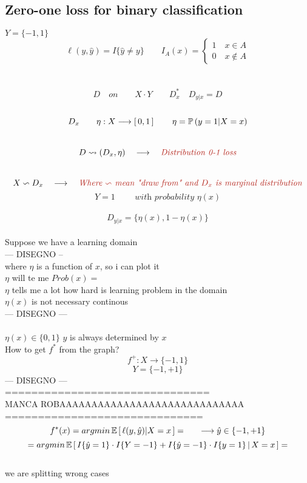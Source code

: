 \documentclass[../main.tex]{subfiles}
\begin{document}
\subsection{Zero-one loss for binary classification}
$ Y = \{-1,1\}
$
$$
\ell(y,\hat{y}) = I \{ \hat{y} \neq y \} 
\qquad I_A (x) = 
\begin{cases}
1 \quad  x \in A
\\
0 \quad  x \not\in A
\end{cases}
$$
\\
\\
$$
D \quad on \qquad X \cdot Y \qquad D_x^* \quad D_{y|x} = D
$$\
$$
D_x \qquad \eta: X \longrightarrow \left[ \, 0,1 \, \right] \qquad \eta = \mathbb{P} \,(y = 1 | X = x )
$$\
$$
D \leadsto (D_x, \eta) \quad \longrightarrow \quad \red{\textit{Distribution 0-1 loss}}
$$\
$$
X \backsim D_x \quad \longrightarrow \quad \red{ \textit{Where $\backsim$ mean "draw from" and $D_x$ is marginal distribution} }  
$$
$$
Y = 1 \qquad \textit{   with probability } \eta(x)
$$\
$$
D_{y|x} = \{ \eta(x), 1- \eta(x) \}
$$
\\
Suppose we have a learning domain\\
--- DISEGNO --
\\
where $\eta$ is a function of $x$, so i can plot it\\
$\eta$ will te me $Prob (x) = $
\\
$\eta$ tells me a lot how hard is learning problem in the domain
\\
$\eta(x)$ is not necessary continous
\\
--- DISEGNO ---
\\\\
$\eta(x) \in \{0,1\} $ \qquad $y$ is always determined by $x$
\\
How to get $f^*$ from the graph?
\\
$$
f^+ : X \rightarrow \{-1,1\}
$$
$$
Y = \{-1, +1 \}
$$
--- DISEGNO ---\\
===============================\\
MANCA ROBAAAAAAAAAAAAAAAAAAAAAAAAAAAAA\\
==============================
$$
f^*(x) = argmin \, \mathbb{E} \left[ \,  \ell(y, \hat{y}) | X= x\, \right] =  \qquad \longrightarrow \hat{y} \in \{-1,+1 \}
$$
$$
= argmin \,  \mathbb{E} \left[ \, I\{\hat{y} = 1\} \cdot I\{Y=-1\} + I\{\hat{y}=-1\} \cdot I\{y=1\} \, | \, X = x \, \right] =
$$
\\
we are splitting wrong cases
\end{document}

